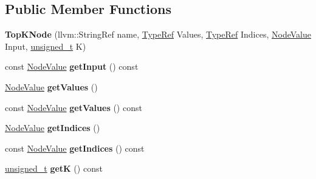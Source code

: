 \subsection*{Public Member Functions}
\begin{DoxyCompactItemize}
\item 
\mbox{\label{classglow_1_1_top_k_node_aa1323bac481b78b6a8a01e426310672b}} 
{\bfseries Top\+K\+Node} (llvm\+::\+String\+Ref name, \hyperlink{structglow_1_1_type}{Type\+Ref} Values, \hyperlink{structglow_1_1_type}{Type\+Ref} Indices, \hyperlink{structglow_1_1_node_value}{Node\+Value} Input, \hyperlink{namespaceglow_a0ca574644e1e42ef193a9947fb4d8911}{unsigned\+\_\+t} K)
\item 
\mbox{\label{classglow_1_1_top_k_node_abcf37659f267192b7243792bf255212c}} 
const \hyperlink{structglow_1_1_node_value}{Node\+Value} {\bfseries get\+Input} () const
\item 
\mbox{\label{classglow_1_1_top_k_node_a8aad392af0e15c87242c4eaa03393423}} 
\hyperlink{structglow_1_1_node_value}{Node\+Value} {\bfseries get\+Values} ()
\item 
\mbox{\label{classglow_1_1_top_k_node_a958f9f9b87707753f5888cb008e8a6e6}} 
const \hyperlink{structglow_1_1_node_value}{Node\+Value} {\bfseries get\+Values} () const
\item 
\mbox{\label{classglow_1_1_top_k_node_a9794e6464325055e213673734112baa0}} 
\hyperlink{structglow_1_1_node_value}{Node\+Value} {\bfseries get\+Indices} ()
\item 
\mbox{\label{classglow_1_1_top_k_node_acfacec8776cb4d74d7139a2081770b4c}} 
const \hyperlink{structglow_1_1_node_value}{Node\+Value} {\bfseries get\+Indices} () const
\item 
\mbox{\label{classglow_1_1_top_k_node_a5e316332096a63ab10f5d2103886dbe9}} 
\hyperlink{namespaceglow_a0ca574644e1e42ef193a9947fb4d8911}{unsigned\+\_\+t} {\bfseries getK} () const
\item 
\mbox{\label{classglow_1_1_top_k_node_a8e2b425e1a7d5d0a6b0c7fd183e25ee6}} 

\end{DoxyCompactItemize}
